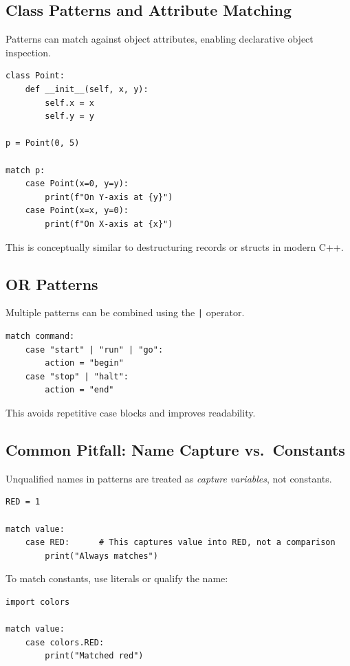 \subsection{Class Patterns and Attribute Matching}

Patterns can match against object attributes, enabling declarative object inspection.

\begin{verbatim}
class Point:
    def __init__(self, x, y):
        self.x = x
        self.y = y

p = Point(0, 5)

match p:
    case Point(x=0, y=y):
        print(f"On Y-axis at {y}")
    case Point(x=x, y=0):
        print(f"On X-axis at {x}")
\end{verbatim}

This is conceptually similar to destructuring records or structs in modern C++.

\subsection{OR Patterns}

Multiple patterns can be combined using the \texttt{|} operator.

\begin{verbatim}
match command:
    case "start" | "run" | "go":
        action = "begin"
    case "stop" | "halt":
        action = "end"
\end{verbatim}

This avoids repetitive case blocks and improves readability.

\subsection{Common Pitfall: Name Capture vs.\ Constants}

Unqualified names in patterns are treated as \emph{capture variables}, not constants.

\begin{verbatim}
RED = 1

match value:
    case RED:      # This captures value into RED, not a comparison
        print("Always matches")
\end{verbatim}

To match constants, use literals or qualify the name:

\begin{verbatim}
import colors

match value:
    case colors.RED:
        print("Matched red")
\end{verbatim}

